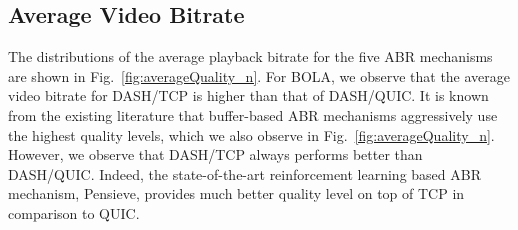 \subsection{Average Video Bitrate}
The distributions of the average playback bitrate for the five ABR mechanisms are shown in Fig.~\ref{fig:averageQuality_n}. For BOLA, we observe that the average video bitrate for DASH/TCP is higher than that of DASH/QUIC. It is known from the existing literature that buffer-based ABR mechanisms aggressively use the highest quality levels, which we also observe in Fig.~\ref{fig:averageQuality_n}. However, we observe that DASH/TCP always performs better than DASH/QUIC. Indeed, the state-of-the-art reinforcement learning based ABR mechanism, Pensieve, provides much better quality level on top of TCP in comparison to QUIC.  


